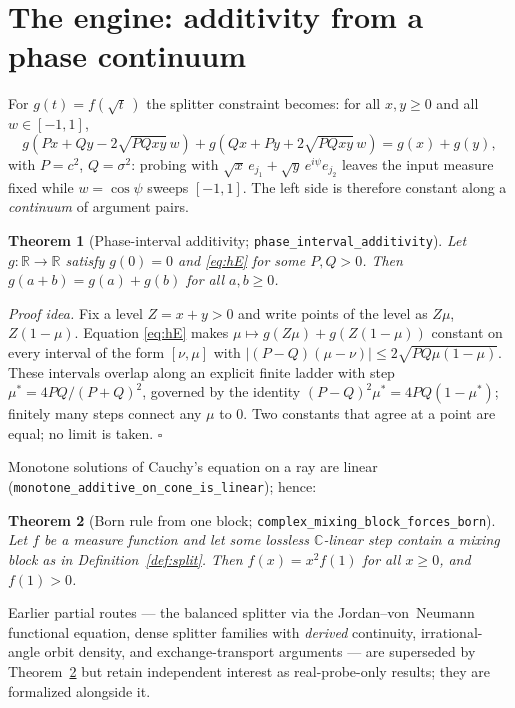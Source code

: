 \documentclass[11pt]{article}
\newtheorem{theorem}{Theorem}[section]
\newcommand{\R}{\mathbb{R}}
\newcommand{\C}{\mathbb{C}}
\begin{document}
\section{The engine: additivity from a phase continuum}
\label{sec:engine}

For $g(t)=f(\sqrt{t}\,)$ the splitter constraint becomes: for all
$x,y\ge0$ and all $w\in[-1,1]$,
\begin{equation}\label{eq:hE}
g\!\left(Px+Qy-2\sqrt{PQxy}\,w\right)
+g\!\left(Qx+Py+2\sqrt{PQxy}\,w\right)=g(x)+g(y),
\end{equation}
with $P=c^2$, $Q=\sigma^2$: probing with
$\sqrt{x}\,e_{j_1}+\sqrt{y}\,e^{i\psi}e_{j_2}$ leaves the input
measure fixed while $w=\cos\psi$ sweeps $[-1,1]$.  The left side is
therefore constant along a \emph{continuum} of argument pairs.

\begin{theorem}[Phase-interval additivity;
\texttt{phase\_interval\_additivity}]\label{thm:additivity}
Let $g:\R\to\R$ satisfy $g(0)=0$ and \eqref{eq:hE} for some $P,Q>0$.
Then $g(a+b)=g(a)+g(b)$ for all $a,b\ge0$.
\end{theorem}

\emph{Proof idea.}  Fix a level $Z=x+y>0$ and write points of the
level as $Z\mu$, $Z(1-\mu)$.  Equation \eqref{eq:hE} makes
$\mu\mapsto g(Z\mu)+g(Z(1-\mu))$ constant on every interval of the
form $[\nu,\mu]$ with
$\lvert(P-Q)(\mu-\nu)\rvert\le2\sqrt{PQ\mu(1-\mu)}$.  These intervals
overlap along an explicit finite ladder with step
$\mu^*=4PQ/(P+Q)^2$, governed by the identity
$(P-Q)^2\mu^*=4PQ(1-\mu^*)$; finitely many steps connect any $\mu$ to
$0$.  Two constants that agree at a point are equal; no limit is
taken. \hfill$\square$

Monotone solutions of Cauchy's equation on a ray are linear
(\texttt{monotone\_additive\_on\_cone\_is\_linear}); hence:

\begin{theorem}[Born rule from one block;
\texttt{complex\_mixing\_block\_forces\_born}]\label{thm:born}
Let $f$ be a measure function and let some lossless $\C$-linear step
contain a mixing block as in Definition~\ref{def:split}.  Then
$f(x)=x^2 f(1)$ for all $x\ge0$, and $f(1)>0$.
\end{theorem}

Earlier partial routes --- the balanced splitter via the
Jordan--von~Neumann functional equation, dense splitter families with
\emph{derived} continuity, irrational-angle orbit density, and
exchange-transport arguments --- are superseded by
Theorem~\ref{thm:born} but retain independent interest as
real-probe-only results; they are formalized alongside it.
\end{document}
